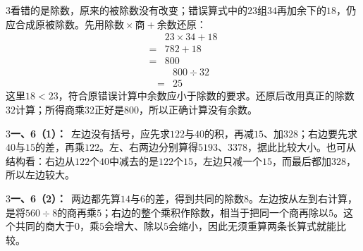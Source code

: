 \documentclass[multi=snippet,border={5bp 20bp 5bp 5bp}]{standalone}
\newenvironment{snippet}[3]{\begin{minipage}{#1bp}\color{answerred}\fontsize{#2}{#3}\selectfont\raggedright}{\end{minipage}}
\begin{document}
\begin{snippet}{505}{11.5}{14}\begin{multicols}{3}\raggedcolumns 看错的是除数，原来的被除数没有改变；错误算式中的\(23\)\allowbreak 组\(34\)\allowbreak 再加余下的\(18\)\allowbreak ，仍应合成原被除数。先用\(\text{除数}\times\text{商}+\text{余数}\)\allowbreak 还原：\[\begin{aligned}&23\times34+18\\={}&782+18\\={}&800\end{aligned}\]\[\begin{aligned}&800\div32\\={}&25\end{aligned}\]这里\(18<23\)\allowbreak ，符合原错误计算中余数应小于除数的要求。还原后改用真正的除数\(32\)\allowbreak 计算；所得商乘\(32\)\allowbreak 正好是\(800\)\allowbreak ，所以正确计算没有余数。\end{multicols}\end{snippet}
\begin{snippet}{505}{11.5}{14}\begin{multicols}{3}\raggedcolumns \textbf{一、6（1）：}\ 左边没有括号，应先求\(122\)\allowbreak 与\(40\)\allowbreak 的积，再减\(15\)\allowbreak 、加\(328\)\allowbreak ；右边要先求\(40\)\allowbreak 与\(15\)\allowbreak 的差，再乘\(122\)\allowbreak 。左、右两边分别算得\(5193\)\allowbreak 、\(3378\)\allowbreak ，据此比较大小。也可从结构看：右边从\(122\)\allowbreak 个\(40\)\allowbreak 中减去的是\(122\)\allowbreak 个\(15\)\allowbreak ，左边只减一个\(15\)\allowbreak ，而最后都加\(328\)\allowbreak ，所以左边较大。\end{multicols}\end{snippet}
\begin{snippet}{505}{11.5}{14}\begin{multicols}{3}\raggedcolumns \textbf{一、6（2）：}\ 两边都先算\(14\)\allowbreak 与\(6\)\allowbreak 的差，得到共同的除数\(8\)\allowbreak 。左边按从左到右计算，是将\(560\div8\)\allowbreak 的商再乘\(5\)\allowbreak ；右边的整个乘积作除数，相当于把同一个商再除以\(5\)\allowbreak 。这个共同的商大于\(0\)\allowbreak ，乘\(5\)\allowbreak 会增大、除以\(5\)\allowbreak 会缩小，因此无须重算两条长算式就能比较。\end{multicols}\end{snippet}
\end{document}
